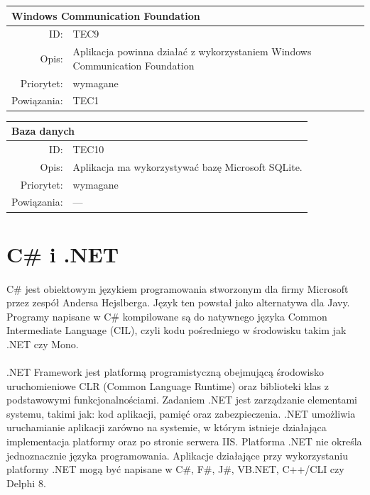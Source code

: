       \begin{center}
      \begin{tabular}{rp{10cm}}
        \multicolumn{2}{l}{\textbf{Windows Communication Foundation}} \\
        \hline
        ID: & TEC9 \\
        Opis: & Aplikacja powinna działać z wykorzystaniem Windows Communication Foundation \\
        Priorytet: & wymagane \\
        Powiązania: & TEC1 \\
      \end{tabular}
      \end{center}

      \begin{center}
      \begin{tabular}{rp{10cm}}
        \multicolumn{2}{l}{\textbf{Baza danych}} \\
        \hline
        ID: & TEC10 \\
        Opis: & Aplikacja ma wykorzystywać bazę Microsoft SQLite. \\
        Priorytet: & wymagane \\
        Powiązania: & --- \\
      \end{tabular}
      \end{center}


\section{ C\# i .NET }
\label{sec:jezyk}
\paragraph{}
C\# \cite{csharp}  jest obiektowym językiem programowania stworzonym dla firmy Microsoft przez zespół Andersa Hejslberga. Język ten powstał jako alternatywa dla Javy. Programy napisane w C\# kompilowane są do natywnego języka Common Intermediate Language (CIL), czyli kodu pośredniego w środowisku takim jak .NET czy Mono.
\paragraph{}
.NET Framework jest platformą programistyczną obejmującą środowisko uruchomieniowe CLR (Common Language Runtime) oraz biblioteki klas z podstawowymi funkcjonalnościami. Zadaniem .NET jest zarządzanie elementami systemu, takimi jak: kod aplikacji, pamięć oraz zabezpieczenia. .NET umożliwia uruchamianie aplikacji zarówno na systemie, w którym istnieje działająca implementacja platformy oraz po stronie serwera IIS. Platforma .NET nie określa jednoznacznie języka programowania. Aplikacje działające przy wykorzystaniu platformy .NET mogą być napisane w C\#, F\#, J\#, VB.NET, C++/CLI czy Delphi 8. 

